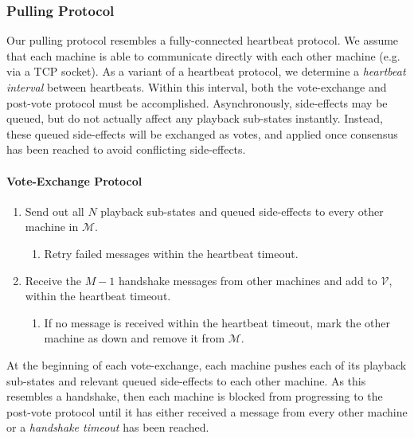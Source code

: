 \documentclass[%
               nonacm,sigconf,10pt]{acmart}
\newcommand{\cM}{\mathcal{M}}
\begin{document}
\subsubsection{Pulling Protocol}\label{subsubsec:pull-proto}

Our pulling protocol resembles a fully-connected heartbeat protocol. We assume that each machine is able to communicate directly with each other machine (e.g. via a TCP socket). As a variant of a heartbeat protocol, we determine a {\it heartbeat interval} between heartbeats. Within this interval, both the vote-exchange and post-vote protocol must be accomplished. Asynchronously, side-effects may be queued, but do not actually affect any playback sub-states instantly. Instead, these queued side-effects will be exchanged as votes, and applied once consensus has been reached to avoid conflicting side-effects. 

\paragraph{Vote-Exchange Protocol}

\begin{enumerate}
    \item Send out all $N$ playback sub-states and queued side-effects to every other machine in $\cM$.
        \begin{enumerate}
            \item Retry failed messages within the heartbeat timeout.
        \end{enumerate}
    \item Receive the $M - 1$ handshake messages from other machines and add to $\mathcal{V}$, within the heartbeat timeout.
        \begin{enumerate}
            \item If no message is received within the heartbeat timeout, mark the other machine as down and remove it from $\cM$.
        \end{enumerate}
\end{enumerate}

At the beginning of each vote-exchange, each machine pushes each of its playback sub-states and relevant queued side-effects to each other machine. As this resembles a handshake, then each machine is blocked from progressing to the post-vote protocol until it has either received a message from every other machine or a {\it handshake timeout} has been reached.
\end{document}
